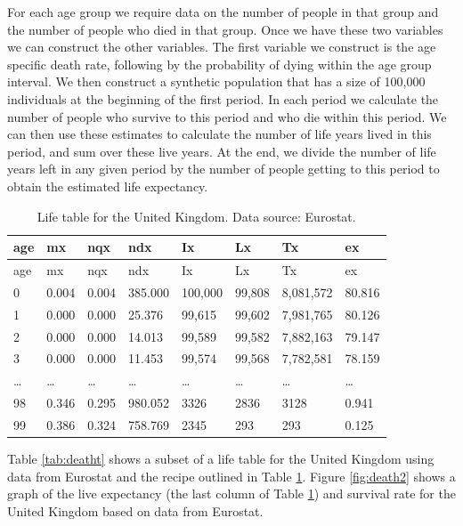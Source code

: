 \documentclass[]{book}
\begin{document}
For each age group we require data on the number of people in that group and the number of people who died in that group. Once we have these two variables we can construct the other variables. The first variable we construct is the age specific death rate, following by the probability of dying within the age group interval. We then construct a synthetic population that has a size of 100,000 individuals at the beginning of the first period. In each period we calculate the number of people who survive to this period and who die within this period. We can then use these estimates to calculate the number of life years lived in this period, and sum over these live years. At the end, we divide the number of life years left in any given period by the number of people getting to this period to obtain the estimated life expectancy.

\begin{longtable}[]{@{}llllllll@{}}
\caption{\label{tab:deatht2} Life table for the United Kingdom. Data source: Eurostat.}\tabularnewline
\toprule
age & mx & nqx & ndx & Ix & Lx & Tx & ex\tabularnewline
\midrule
\endfirsthead
\toprule
age & mx & nqx & ndx & Ix & Lx & Tx & ex\tabularnewline
\midrule
\endhead
0 & 0.004 & 0.004 & 385.000 & 100,000 & 99,808 & 8,081,572 & 80.816\tabularnewline
1 & 0.000 & 0.000 & 25.376 & 99,615 & 99,602 & 7,981,765 & 80.126\tabularnewline
2 & 0.000 & 0.000 & 14.013 & 99,589 & 99,582 & 7,882,163 & 79.147\tabularnewline
3 & 0.000 & 0.000 & 11.453 & 99,574 & 99,568 & 7,782,581 & 78.159\tabularnewline
\ldots{} & \ldots{} & \ldots{} & \ldots{} & \ldots{} & \ldots{} & \ldots{} & \ldots{}\tabularnewline
98 & 0.346 & 0.295 & 980.052 & 3326 & 2836 & 3128 & 0.941\tabularnewline
99 & 0.386 & 0.324 & 758.769 & 2345 & 293 & 293 & 0.125\tabularnewline
\bottomrule
\end{longtable}

Table \ref{tab:deatht} shows a subset of a life table for the United Kingdom using data from Eurostat and the recipe outlined in Table \ref{tab:deatht2}. Figure \ref{fig:death2} shows a graph of the live expectancy (the last column of Table \ref{tab:deatht2}) and survival rate for the United Kingdom based on data from Eurostat.
\end{document}
